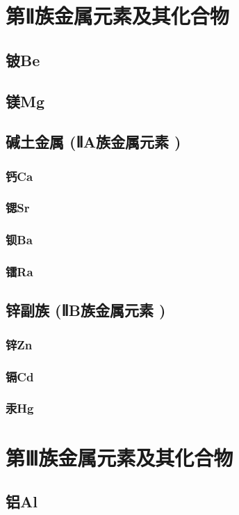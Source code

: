 \documentclass[UTF8]{../03-Chemistry}
\begin{document}
\section{第Ⅱ族金属元素及其化合物}
    \subsection{铍Be}
    \subsection{镁Mg}
    \subsection{碱土金属 (ⅡA族金属元素 )}
        \subsubsection{钙Ca}
        \subsubsection{锶Sr}
        \subsubsection{钡Ba}
        \subsubsection{镭Ra}
    \subsection{锌副族 (ⅡB族金属元素 )}
        \subsubsection{锌Zn}
        \subsubsection{镉Cd}
        \subsubsection{汞Hg}

\section{第Ⅲ族金属元素及其化合物}
    \subsection{铝Al}
\end{document}
